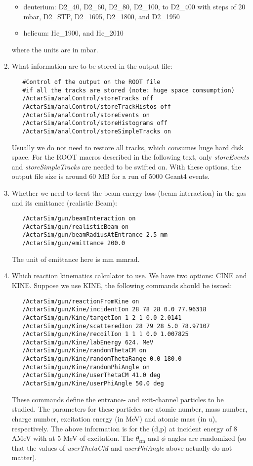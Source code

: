 \begin{enumerate}
\begin{itemize}
    \item deuterium: D2\_40, D2\_60, D2\_80, D2\_100, to D2\_400 with steps of 20 mbar, D2\_STP, D2\_1695, D2\_1800, and D2\_1950

    \item helieum:   He\_1900, and He\_2010
  \end{itemize}
where the units are in mbar.

\item What information are to be stored in the output file:
  \begin{verbatim}
   #Control of the output on the ROOT file
   #if all the tracks are stored (note: huge space comsumption)
   /ActarSim/analControl/storeTracks off
   /ActarSim/analControl/storeTrackHistos off
   /ActarSim/analControl/storeEvents on
   /ActarSim/analControl/storeHistograms off
   /ActarSim/analControl/storeSimpleTracks on
  \end{verbatim}
Usually we do not need to restore all tracks, which consumes huge hard disk space. For the ROOT macros described in the following text, only \textit{storeEvents} and \textit{storeSimpleTracks} are needed to be swifted on. With these options, the output file size is around 60 MB for a run of 5000 Geant4 events.

\item Whether we need to treat the beam energy loss (beam interaction) in the gas and its emittance (realistic Beam):
  \begin{verbatim}
   /ActarSim/gun/beamInteraction on
   /ActarSim/gun/realisticBeam on
   /ActarSim/gun/beamRadiusAtEntrance 2.5 mm
   /ActarSim/gun/emittance 200.0
  \end{verbatim}
The unit of emittance here is mm mmrad.

\item Which reaction kinematics calculator to use. We have two options: CINE and KINE. Suppose we use KINE, the following commands should be issued:
  \begin{verbatim}
   /ActarSim/gun/reactionFromKine on
   /ActarSim/gun/Kine/incidentIon 28 78 28 0.0 77.96318
   /ActarSim/gun/Kine/targetIon 1 2 1 0.0 2.0141
   /ActarSim/gun/Kine/scatteredIon 28 79 28 5.0 78.97107
   /ActarSim/gun/Kine/recoilIon 1 1 1 0.0 1.007825
   /ActarSim/gun/Kine/labEnergy 624. MeV
   /ActarSim/gun/Kine/randomThetaCM on
   /ActarSim/gun/Kine/randomThetaRange 0.0 180.0
   /ActarSim/gun/Kine/randomPhiAngle on
   /ActarSim/gun/Kine/userThetaCM 41.0 deg
   /ActarSim/gun/Kine/userPhiAngle 50.0 deg
  \end{verbatim}
These commands define the entrance- and exit-channel particles to be studied. The parameters for these particles are atomic number, mass number, charge number, excitation energy (in MeV) and atomic mass (in u), respectively. The above information is for the (d,p) at incident energy of 8 AMeV with  at 5 MeV of excitation. The $\theta_\text{cm}$ and $\phi$ angles are randomized (so that the values of \textit{userThetaCM} and \textit{userPhiAngle} above actually do not matter).
\end{enumerate}

